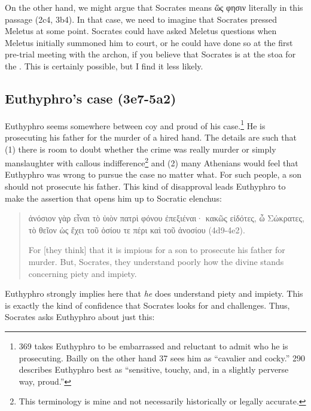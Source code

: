 \documentclass[11pt]{article}
\begin{document}
On the other hand, we might argue that Socrates means {\g ὥς φησιν} literally in this passage (2c4, 3b4).  In that case, we need to imagine that Socrates pressed Meletus at some point.  Socrates could have asked Meletus questions when Meletus initially summoned him to court, or he could have done so at the first pre-trial meeting with the archon, if you believe that Socrates is at the stoa for the .  This is certainly possible, but I find it less likely.


\subsection{Euthyphro's case (3e7-5a2)}

Euthyphro seems somewhere between coy and proud of his case.\footnote{\citet{geach1966} 369 takes Euthyphro to be embarrassed and reluctant to admit who he is prosecuting.  Bailly on the other hand \citeyearpar{bailly2003} 37 sees him as ``cavalier and cocky.'' \citet{nehamas1975} 290 describes Euthyphro best as ``sensitive, touchy, and, in a slightly perverse way, proud.''}  He is prosecuting his father for the murder of a hired hand.  The details are such that (1) there is room to doubt whether the crime was really murder or simply manslaughter with callous indifference\footnote{This terminology is mine and not necessarily historically or legally accurate.} and (2) many Athenians would feel that Euthyphro was wrong to pursue the case no matter what.  For such people, a son should not prosecute his father.  This kind of disapproval leads Euthyphro to make the assertion that opens him up to Socratic elenchus:

\begin{quote}

    {\g
    ἀνόσιον γὰρ εἶναι τὸ ὑιὸν πατρὶ φόνου ἐπεξιέναι· κακῶς εἰδότες, ὦ Σώκρατες, τὸ θεῖον ὡς ἔχει τοῦ ὁσίου τε πέρι καὶ τοῦ ἀνοσίου
    } (4d9-4e2).

    For [they think] that it is impious for a son to prosecute his father for murder.  But, Socrates, they understand poorly how the divine stands concerning piety and impiety.

\end{quote}

Euthyphro strongly implies here that \emph{he} does understand piety and impiety.  This is exactly the kind of confidence that Socrates looks for and challenges. Thus, Socrates asks Euthyphro about just this:
\end{document}
